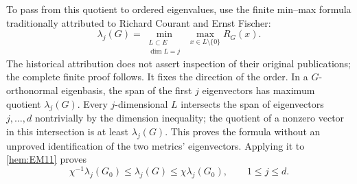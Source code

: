 To pass from this quotient to ordered eigenvalues, use the finite min--max
formula traditionally attributed to Richard Courant and Ernst Fischer:
\[
 \lambda_j(G)=
 \min_{\substack{L\subset E\\\dim L=j}}\ 
 \max_{x\in L\setminus\{0\}} R_G(x).
\]
The historical attribution does not assert inspection of their original
publications; the complete finite proof follows. It fixes the direction of
the order. In a
\(G\)-orthonormal eigenbasis, the span of the first \(j\) eigenvectors
has maximum quotient \(\lambda_j(G)\). Every \(j\)-dimensional \(L\)
intersects the span of eigenvectors \(j,\ldots,d\) nontrivially by the
dimension inequality; the quotient of a nonzero vector in this
intersection is at least \(\lambda_j(G)\). This proves the formula
without an unproved identification of the two metrics' eigenvectors.
Applying it to \eqref{hem:EM11} proves
\begin{equation}
 \chi^{-1}\lambda_j(G_0)\le\lambda_j(G)
          \le\chi\lambda_j(G_0),\qquad 1\le j\le d.
 \tag{EM12}\label{hem:EM12}
\end{equation}

